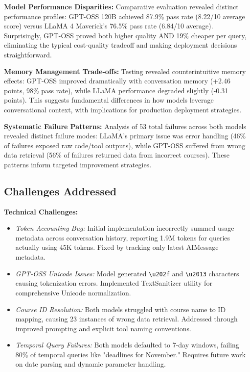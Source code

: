 \documentclass{article}
\begin{document}
\textbf{Model Performance Disparities:} Comparative evaluation revealed distinct performance profiles: GPT-OSS 120B achieved 87.9\% pass rate (8.22/10 average score) versus LLaMA 4 Maverick's 76.5\% pass rate (6.84/10 average). Surprisingly, GPT-OSS proved both higher quality AND 19\% cheaper per query, 
eliminating the typical cost-quality tradeoff and making deployment decisions straightforward.

\textbf{Memory Management Trade-offs:} Testing revealed counterintuitive memory effects: GPT-OSS improved dramatically with conversation memory (+2.46 points, 98\% pass rate), while LLaMA performance degraded slightly (-0.31 points). This suggests fundamental differences in how models leverage conversational context, with implications for production deployment strategies.

\textbf{Systematic Failure Patterns:} Analysis of 53 total failures across both models revealed distinct failure modes: LLaMA's primary issue was error handling (46\% of failures exposed raw code/tool outputs), while GPT-OSS suffered from wrong data retrieval (56\% of failures returned data from incorrect courses). These patterns inform targeted improvement strategies.

\subsection{Challenges Addressed}

\textbf{Technical Challenges:}
\begin{itemize}
    \item \textit{Token Accounting Bug:} Initial implementation incorrectly summed usage metadata across conversation history, reporting 1.9M tokens for queries actually using 45K tokens. Fixed by tracking only latest AIMessage metadata.
    \item \textit{GPT-OSS Unicode Issues:} Model generated \texttt{\textbackslash u202f} and \texttt{\textbackslash u2013} characters causing tokenization errors. Implemented TextSanitizer utility for comprehensive Unicode normalization.
    \item \textit{Course ID Resolution:} Both models struggled with course name to ID mapping, causing 23 instances of wrong data retrieval. Addressed through improved prompting and explicit tool naming conventions.
    \item \textit{Temporal Query Failures:} Both models defaulted to 7-day windows, failing 80\% of temporal queries like "deadlines for November." Requires future work on date parsing and dynamic parameter handling.
\end{itemize}
\end{document}
